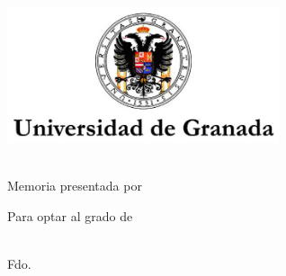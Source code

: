 \begin{titlepage}
    \begin{center}
        \large
        \vspace*{3cm}
        \includegraphics[width=8cm]{gfx/ugr_formal} \\

        \vspace{2cm}

        {\color{ugrOrange}\spacedallcaps{\myTitle}} \\ \bigskip
	{\textcolor{ugrGray} {\small Memoria presentada por}} \\ \bigskip
        \spacedlowsmallcaps{\myName}

        \vspace{2cm}
{\textcolor{ugrGray}
        {\small Para optar al grado de}\normalsize\\
        \large\spacedlowsmallcaps{\myDegree} \\ 

        \vspace{3.5cm}

        {\small Fdo. \myName }\\ \bigskip
	\myTime
}

    \end{center}
\end{titlepage}   
